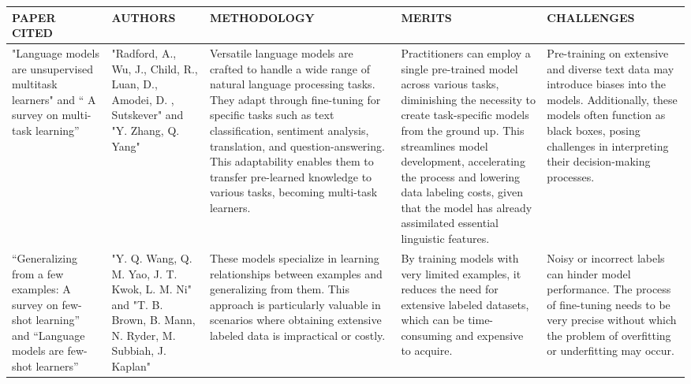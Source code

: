 \documentclass[fleqn,10pt]{thescipub} %
\begin{document}
\begin{table}
\begin{center}
\begin{tabular}{ |p{2cm}|p{1.5cm}|p{3.75cm}|p{3.75cm}|p{4cm}| }
\hline
\end{tabular}
\end{center}
\end{table}

\begin{table}
\begin{center}
 \centering
  \small %
    \begin{tabular}{ |p{2cm}|p{2cm}|p{4cm}|p{4cm}|p{3cm}| }
\hline
\centering PAPER CITED & \centering  AUTHORS & \centering METHODOLOGY &  \centering MERITS &  \centering CHALLENGES \arraybackslash \\ 
\hline
"Language models are unsupervised multitask learners"  and  “ A survey on multi-task learning” & "Radford, A., Wu, J., Child, R., Luan, D., Amodei, D. , Sutskever" and "Y. Zhang, Q. Yang" & Versatile language models are crafted to handle a wide range of natural language processing tasks. They adapt through fine-tuning for specific tasks such as text classification, sentiment analysis, translation, and question-answering. This adaptability enables them to transfer pre-learned knowledge to various tasks, becoming multi-task learners. & Practitioners can employ a single pre-trained model across various tasks, diminishing the necessity to create task-specific models from the ground up. This streamlines model development, accelerating the process and lowering data labeling costs, given that the model has already assimilated essential linguistic features. & Pre-training on extensive and diverse text data may introduce biases into the models. Additionally, these models often function as black boxes, posing challenges in interpreting their decision-making processes. \\
\hline
 “Generalizing from a few examples: A survey on few-shot learning” and “Language models are few-shot learners”  & "Y. Q. Wang, Q. M. Yao, J. T. Kwok, L. M. Ni" and "T. B. Brown, B. Mann, N. Ryder, M. Subbiah, J. Kaplan" & These models specialize in learning relationships between examples and generalizing from them. This approach is particularly valuable in scenarios where obtaining extensive labeled data is impractical or costly. & By training models with very limited examples, it reduces the need for extensive labeled datasets, which can be time-consuming and expensive to acquire. & Noisy or incorrect labels can hinder model performance. The process of fine-tuning needs to be very precise without which the problem of overfitting or underfitting may occur. \\

\end{tabular}
\end{center}
\end{table}
\end{document}
